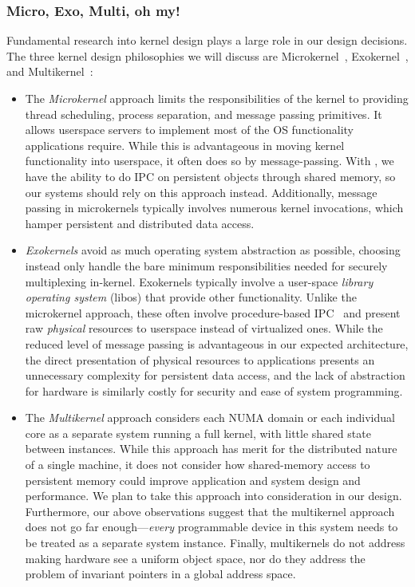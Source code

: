 \subsubsection{Micro, Exo, Multi, oh my!}

Fundamental research into kernel design plays a large role in our design decisions. The three kernel
design philosophies we will discuss are Microkernel~\cite{accetta:usenix86s},
Exokernel~\cite{engler:sosp95}, and Multikernel~\cite{baumann:sosp09}:
\begin{itemize}
    \item The \emph{Microkernel} approach limits the responsibilities of the kernel to providing
          thread scheduling, process separation, and message passing primitives. It allows userspace
          servers to implement most of the OS functionality applications require. While this is
          advantageous in moving kernel functionality into userspace, it often does so by
          message-passing. With \NVM, we have the ability to do IPC on persistent objects through
          shared memory, so our systems should rely on this approach instead. Additionally, message
          passing in microkernels typically involves numerous kernel invocations, which hamper
          persistent and distributed data access.

    \item \emph{Exokernels} avoid as much operating system abstraction as possible, choosing instead
          only handle the bare minimum responsibilities needed for securely multiplexing in-kernel.
          Exokernels typically involve a user-space \textit{library operating system} (libos) that
          provide other functionality. Unlike the microkernel approach, these often involve
          procedure-based IPC~\cite{lauer:osr79,engler:sosp95} and present raw \emph{physical}
          resources to userspace instead of virtualized ones. While the reduced level of message
          passing is advantageous in our expected architecture, the direct presentation of physical resources
          to applications presents an unnecessary complexity for persistent data access, and the lack
          of abstraction for hardware is similarly costly for security and ease of system programming.

    \item The \emph{Multikernel} approach considers each NUMA domain or each individual core as a
          separate system running a full kernel, with little shared state between instances. While
          this approach has merit for the distributed nature of a single machine, it does not consider
          how shared-memory access to persistent memory could improve application and system design
          and performance. We plan to take this approach into consideration in our design.
          Furthermore, our above observations suggest that the multikernel approach does not go far
          enough---\emph{every} programmable device in this system needs to be treated as a separate
          system instance. Finally, multikernels do not address making hardware see a uniform
          object space, nor do they address the problem of invariant pointers in a global address space.
\end{itemize}

